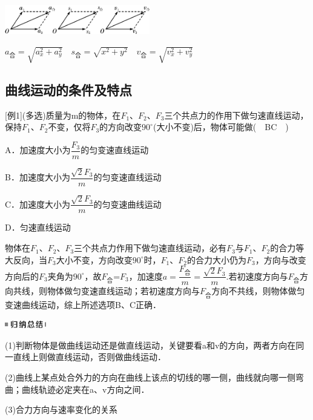 \begin{center}\includegraphics[width=2.48958in,height=0.5in]{media/image140.png}
	
\end{center}
$a_{\text{合}}=\sqrt{a^2_x+a^2_y}$　$s_{\text{合}}=\sqrt{x^2+y^2}$　$v_{\text{合}}=\sqrt{v^2_x+v^2_y}$

\newpage
\subsection{曲线运动的条件及特点}

{[}例1{]}(多选)质量为m的物体，在$F_1$、$F_2$、$F_3$三个共点力的作用下做匀速直线运动，保持$F_1$、$F_2$不变，仅将$F_3$的方向改变$90^\circ$(大小不变)后，物体可能做(　BC　)

A．加速度大小为$\dfrac{F_3}{m}$的匀变速直线运动

B．加速度大小为$\dfrac{\sqrt{2}F_3}{m}$的匀变速直线运动

C．加速度大小为$\dfrac{\sqrt{2}F_3}{m}$的匀变速曲线运动

D．匀速直线运动
\begin{solution}
	物体在$F_1$、$F_2$、$F_3$三个共点力作用下做匀速直线运动，必有$F_3$与$F_1$、$F_2$的合力等大反向，当$F_3$大小不变，方向改变$90^\circ$时，$F_1$、$F_2$的合力大小仍为$F_3$，方向与改变方向后的$F_3$夹角为$90^\circ$，故$F_{\text{合}}$=$F_3$，加速度$a=\dfrac{F_{\text{合}}}{m}=\dfrac{\sqrt{2}F_3}{m}$.若初速度方向与$F_{\text{合}}$方向共线，则物体做匀变速直线运动；若初速度方向与$F_{\text{合}}$方向不共线，则物体做匀变速曲线运动，综上所述选项B、C正确．
\end{solution}


\begin{center}\includegraphics[width=0.70833in,height=0.125in]{media/image13.png}\end{center}

(1)判断物体是做曲线运动还是做直线运动，关键要看a和v的方向，两者方向在同一直线上则做直线运动，否则做曲线运动．

(2)曲线上某点处合外力的方向在曲线上该点的切线的哪一侧，曲线就向哪一侧弯曲；曲线轨迹必定夹在a、v方向之间．

(3)合力方向与速率变化的关系

